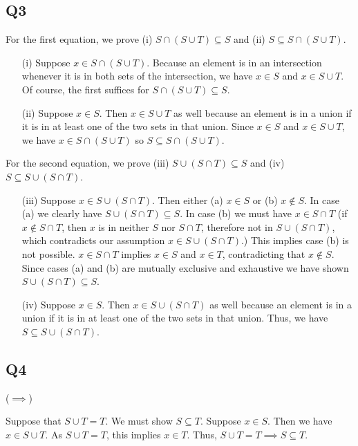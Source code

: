 \documentclass[12pt]{article}
\numberwithin{theorem}{section}
\numberwithin{equation}{section}
\numberwithin{remark}{section}
\numberwithin{definition}{section}
\numberwithin{theorem}{section}
\numberwithin{lemma}{section}
\numberwithin{example}{section}
\begin{document}
\subsection{Q3}
For the first equation, we prove (i) $S\cap\left(S\cup T\right)\subseteq S$ and (ii) $S\subseteq S\cap\left(S\cup T\right)$. 
\begin{itemize}
	\item[(i)]{Suppose $x\in S\cap\left(S\cup T\right)$. Because an element is in an intersection whenever it is in both sets of the intersection, we have $x\in S$ and $x\in S\cup T$. Of course, the first suffices for $S\cap\left(S\cup T\right)\subseteq S$.}
	\item[(ii)]{Suppose $x\in S$. Then $x\in S \cup T$ as well because an element is in a union if it is in at least one of the two sets in that union. Since $x\in S$ and $x\in S \cup T$, we have $x\in S\cap\left(S\cup T\right)$ so $S\subseteq S\cap\left(S\cup T\right)$.}
\end{itemize}
For the second equation, we prove (iii) $S\cup\left(S\cap T\right)\subseteq S$ and (iv) $S\subseteq S\cup\left(S\cap T\right)$. 
\begin{itemize}
	\item[(iii)]{Suppose $x\in S\cup\left(S\cap T\right)$. Then either (a) $x\in S$ or (b) $x\notin S$. In case (a) we clearly have $S\cup\left(S\cap T\right)\subseteq S$. In case (b) we must have $x\in S\cap T$ (if $x\not \in S\cap T$, then $x$ is in neither $S$ nor $S\cap T$, therefore not in $S\cup\left(S\cap T\right)$, which contradicts our assumption $x\in S\cup\left(S\cap T\right)$.) This implies case (b) is not possible. $x\in S\cap T$ implies $x\in S$ and $x\in T$, contradicting that $x\notin S$. Since cases (a) and (b) are mutually exclusive and exhaustive we have shown $S\cup\left(S\cap T\right)\subseteq S$.}
	\item[(iv)]{Suppose $x\in S$. Then $x\in S\cup\left(S\cap T\right)$ as well because an element is in a union if it is in at least one of the two sets in that union. Thus, we have $S\subseteq S\cup\left(S\cap T\right)$.}
\end{itemize}



\subsection{Q4}
\noindent ($\implies$) 

Suppose that $S \cup T = T$. We must show $S \subseteq T$. Suppose $x\in S$. Then we have $x \in S \cup T$. As $S \cup T = T$, this implies $x\in T$. Thus, $S \cup T = T \implies S \subseteq T$.
\end{document}
